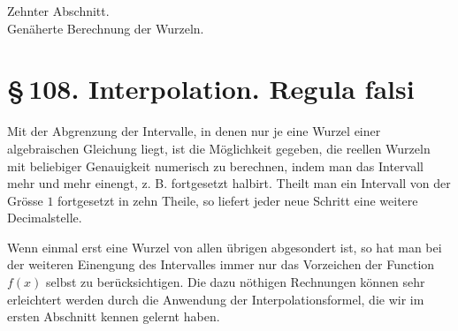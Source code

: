 \documentclass[11pt]{article}
\providecommand{\sect}[2]{\section*{\S\,#1. #2}}
\begin{document}
\newcommand{\weberfigtwentyfour}{
\begin{center}
\begin{tikzpicture}[scale=0.95,line cap=round]
\draw (-1.6,0)--(2.2,0);
\draw (-1.25,-1.1)--(-1.25,1.35);
\draw (1.55,-1.1)--(1.55,1.35);
\draw[smooth,domain=-1.25:1.55,variable=\t] plot ({\t},{-0.95+2.15*sqrt((\t+1.25)/2.8)});
\draw (-1.25,-0.95)--(-0.55,0);
\draw[dashed] (0.70,0)--(1.55,1.10);
\node at (-1.36,-0.16){$\alpha$};
\node at (-0.55,-0.16){$\alpha'$};
\node at (0.70,-0.16){$\beta'$};
\node at (1.68,-0.16){$\beta$};
\node at (-1.35,-1.06){$a$};
\node at (1.65,1.10){$b$};
\end{tikzpicture}\\[-0.2em]
{\small Fig. 24.}
\end{center}
}

\newcommand{\weberfigtwentyfive}{
\begin{center}
\begin{tikzpicture}[scale=0.95,line cap=round]
\draw (-1.6,0)--(2.2,0);
\draw (-1.25,-1.1)--(-1.25,1.35);
\draw (1.55,-1.1)--(1.55,1.35);
\draw[smooth,domain=-1.25:1.55,variable=\t] plot ({\t},{-0.95+2.1*((\t+1.25)/2.8)^2});
\draw (-1.25,-0.95)--(1.55,1.12);
\draw (0.45,0)--(1.55,1.12);
\draw (1.12,0)--(1.55,1.12);
\node at (-1.35,-0.16){$\alpha$};
\node at (0.45,-0.16){$\alpha'$};
\node at (1.10,-0.16){$\beta'$};
\node at (1.68,-0.16){$\beta$};
\end{tikzpicture}\\[-0.2em]
{\small Fig. 25.}
\end{center}
}


\begin{center}
{\Large Zehnter Abschnitt.}\\[0.6em]
{\large Genäherte Berechnung der Wurzeln.}
\end{center}

\sect{108}{Interpolation. Regula falsi}

Mit der Abgrenzung der Intervalle, in denen nur je eine Wurzel einer algebraischen Gleichung liegt, ist die Möglichkeit gegeben, die reellen Wurzeln mit beliebiger Genauigkeit numerisch zu berechnen, indem man das Intervall mehr und mehr einengt, z. B. fortgesetzt halbirt. Theilt man ein Intervall von der Grösse $1$ fortgesetzt in zehn Theile, so liefert jeder neue Schritt eine weitere Decimalstelle.

Wenn einmal erst eine Wurzel von allen übrigen abgesondert ist, so hat man bei der weiteren Einengung des Intervalles immer nur das Vorzeichen der Function $f(x)$ selbst zu berücksichtigen. Die dazu nöthigen Rechnungen können sehr erleichtert werden durch die Anwendung der Interpolationsformel, die wir im ersten Abschnitt kennen gelernt haben.
\end{document}
